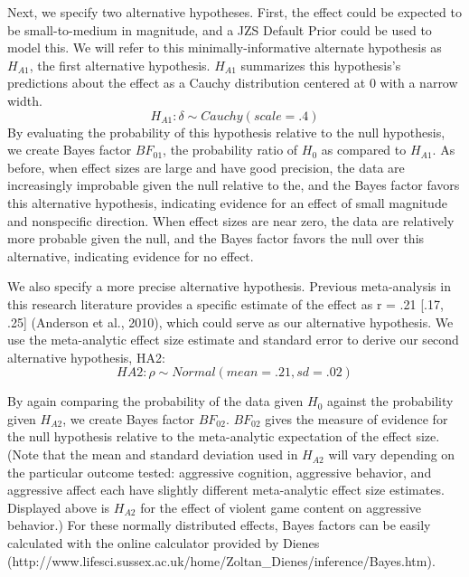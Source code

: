 \documentclass[fignum,nobf,man]{apa}
\begin{document}
Next, we specify two alternative hypotheses. First, the effect could be expected to be small-to-medium in magnitude, and a JZS Default Prior could be used to model this. We will refer to this minimally-informative alternate hypothesis as $H_{A1}$, the first alternative hypothesis. $H_{A1}$ summarizes this hypothesis’s predictions about the effect as a Cauchy distribution centered at 0 with a narrow width.
\begin{equation}
H_{A1}: \delta{} \sim{} Cauchy(scale = .4) 
\end{equation}
By evaluating the probability of this hypothesis relative to the null hypothesis, we create Bayes factor $BF_{01}$, the probability ratio of $H_0$ as compared to $H_{A1}$. As before, when effect sizes are large and have good precision, the data are increasingly improbable given the null relative to the, and the Bayes factor favors this alternative hypothesis, indicating evidence for an effect of small magnitude and nonspecific direction. When effect sizes are near zero, the data are relatively more probable given the null, and the Bayes factor favors the null over this alternative, indicating evidence for no effect. 

We also specify a more precise alternative hypothesis. Previous meta-analysis in this research literature provides a specific estimate of the effect as r = .21 [.17, .25] (Anderson et al., 2010), which could serve as our alternative hypothesis.  We use the meta-analytic effect size estimate and standard error to derive our second alternative hypothesis, HA2:
\begin{equation}
HA2: \rho{} \sim{} Normal(mean=.21, sd=.02)
\end{equation}

By again comparing the probability of the data given $H_0$ against the probability given $H_{A2}$, we create Bayes factor $BF_{02}$. $BF_{02}$ gives the measure of evidence for the null hypothesis relative to the meta-analytic expectation of the effect size. (Note that the mean and standard deviation used in $H_{A2}$ will vary depending on the particular outcome tested: aggressive cognition, aggressive behavior, and aggressive affect each have slightly different meta-analytic effect size estimates. Displayed above is $H_{A2}$ for the effect of violent game content on aggressive behavior.) For these normally distributed effects, Bayes factors can be easily calculated with the online calculator provided by Dienes  (http://www.lifesci.sussex.ac.uk/home/Zoltan\_Dienes/inference/Bayes.htm). %
\end{document}
